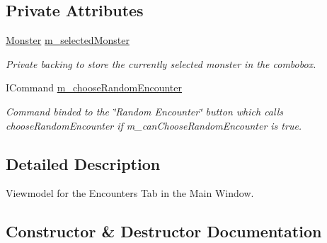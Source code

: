 \subsection*{Private Attributes}
\begin{DoxyCompactItemize}
\item 
\mbox{\hyperlink{class_dungeons__n___dragons___manager_1_1_models_1_1_monster}{Monster}} \mbox{\hyperlink{class_dungeons__n___dragons___manager_1_1_viewmodels_1_1_encounters_tab_viewmodel_a642d4b9fc418b13a9767376b6c5bae5a}{m\+\_\+selected\+Monster}}
\begin{DoxyCompactList}\small\item\em Private backing to store the currently selected monster in the combobox. \end{DoxyCompactList}\item 
I\+Command \mbox{\hyperlink{class_dungeons__n___dragons___manager_1_1_viewmodels_1_1_encounters_tab_viewmodel_a67d74993af6d6c95004186a149c0b32c}{m\+\_\+choose\+Random\+Encounter}}
\begin{DoxyCompactList}\small\item\em Command binded to the \char`\"{}\+Random Encounter\char`\"{} button which calls choose\+Random\+Encounter if m\+\_\+can\+Choose\+Random\+Encounter is true. \end{DoxyCompactList}\end{DoxyCompactItemize}


\subsection{Detailed Description}
Viewmodel for the Encounters Tab in the Main Window. 



\subsection{Constructor \& Destructor Documentation}
\mbox{\label{class_dungeons__n___dragons___manager_1_1_viewmodels_1_1_encounters_tab_viewmodel_a5aa53c0cac6c20d86a8acaba92ee56a7}} 
